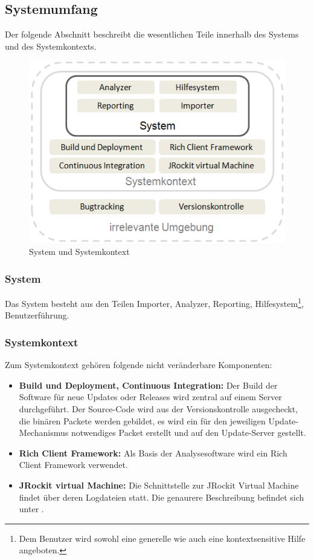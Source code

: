 \subsection{Systemumfang}
Der folgende Abschnitt beschreibt die wesentlichen Teile innerhalb des Systems und des Systemkontexts. 
 \begin{figure}[H]
  	\centering
    	\includegraphics{images/systemumfang}
        	\caption{System und Systemkontext}
\end{figure}
\subsubsection{System}
Das System besteht aus den Teilen Importer, Analyzer, Reporting, Hilfesystem\footnote{Dem Benutzer wird sowohl eine generelle wie auch eine kontextsensitive Hilfe angeboten.}, Benutzerführung.

\subsubsection{Systemkontext}
Zum Systemkontext gehören folgende nicht veränderbare Komponenten:
\begin{itemize}
	\item \textbf{Build und Deployment, Continuous Integration:} Der Build der Software für neue Updates oder Releases wird zentral auf einem Server durchgeführt. Der Source-Code wird aus der Versionskontrolle ausgecheckt, die binären Packete werden gebildet, es wird ein für den jeweiligen Update-Mechanismus notwendiges Packet erstellt und auf den Update-Server gestellt.

	\item \textbf{Rich Client Framework:} Als Basis der Analysesoftware wird ein Rich Client Framework verwendet.
	\item \textbf{JRockit virtual Machine:} Die Schnittstelle zur JRockit Virtual Machine findet über deren Logdateien statt. Die genaurere Beschreibung befindet sich unter .
\end{itemize}

